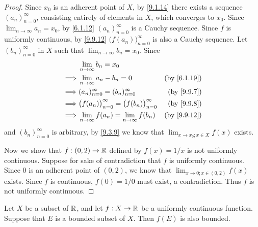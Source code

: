 \begin{proof}
  Since \(x_0\) is an adherent point of \(X\), by \cref{9.1.14} there exists a sequence \((a_n)_{n = 0}^\infty\), consisting entirely of elements in \(X\), which converges to \(x_0\).
  Since \(\lim_{n \to \infty} a_n = x_0\), by \cref{6.1.12} \((a_n)_{n = 0}^\infty\) is a Cauchy sequence.
  Since \(f\) is uniformly continuous, by \cref{9.9.12} \(\big(f(a_n)\big)_{n = 0}^\infty\) is also a Cauchy sequence.
  Let \((b_n)_{n = 0}^\infty\) in \(X\) such that \(\lim_{n \to \infty} b_n = x_0\).
  Since
  \begin{align*}
             & \lim_{n \to \infty} b_n = x_0                                                                 \\
    \implies & \lim_{n \to \infty} a_n - b_n = 0                                 & \text{(by \cref{6.1.19})} \\
    \implies & (a_n)_{n = 0}^\infty = (b_n)_{n = 0}^\infty                       & \text{(by \cref{9.9.7})}  \\
    \implies & \big(f(a_n)\big)_{n = 0}^\infty = \big(f(b_n)\big)_{n = 0}^\infty & \text{(by \cref{9.9.8})}  \\
    \implies & \lim_{n \to \infty} f(a_n) = \lim_{n \to \infty} f(b_n)           & \text{(by \cref{9.9.12})}
  \end{align*}
  and \((b_n)_{n = 0}^\infty\) is arbitrary, by \cref{9.3.9} we know that \(\lim_{x \to x_0 ; x \in X} f(x)\) exists.

  Now we show that \(f : (0, 2) \to \mathbb{R}\) defined by \(f(x) = 1 / x\) is not uniformly continuous.
  Suppose for sake of contradiction that \(f\) is uniformly continuous.
  Since \(0\) is an adherent point of \((0, 2)\), we know that \(\lim_{x \to 0 ; x \in (0, 2)} f(x)\) exists.
  Since \(f\) is continuous, \(f(0) = 1 / 0\) must exist, a contradiction.
  Thus \(f\) is not uniformly continuous.
\end{proof}

\begin{prop}\label{9.9.15}
  Let \(X\) be a subset of \(\mathbb{R}\), and let \(f : X \to \mathbb{R}\) be a uniformly continuous function.
  Suppose that \(E\) is a bounded subset of \(X\).
  Then \(f(E)\) is also bounded.
\end{prop}


